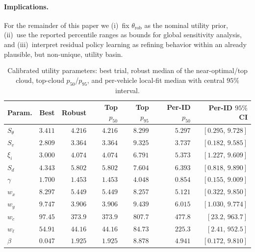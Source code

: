\paragraph{Implications.}
For the remainder of this paper we (i)~fix $\theta_{\mathrm{rob}}$ as the nominal utility prior, (ii)~use the reported percentile ranges as bounds for global sensitivity analysis, and (iii)~interpret residual policy learning as refining behavior within an already plausible, but non-unique, utility basin.

\begin{table}[t]
\centering
\caption{Calibrated utility parameters: best trial, robust median of the near-optimal/top cloud, top-cloud $p_{50}$/$p_{95}$, and per-vehicle local-fit median with central $95\%$ interval.}
\label{tab:utility_calibration_params}
\begin{tabular}{lrrrrrr}
\toprule
Param. & Best & Robust & Top $p_{50}$ & Top $p_{95}$ & Per-ID $p_{50}$ & Per-ID $95\%$ CI \\
\midrule
$S_\theta$ & $3.411$ & $4.216$ & $4.216$ & $8.299$ & $5.297$ & $[0.295,\,9.728]$ \\
$S_v$      & $2.809$ & $3.364$ & $3.364$ & $9.325$ & $3.737$ & $[0.182,\,9.585]$ \\
$\xi_i$    & $3.000$ & $4.074$ & $4.074$ & $6.791$ & $5.373$ & $[1.227,\,9.609]$ \\
$S_d$      & $4.343$ & $5.802$ & $5.802$ & $7.604$ & $6.393$ & $[0.818,\,9.890]$ \\
$\gamma$   & $1.700$ & $1.453$ & $1.453$ & $4.048$ & $0.854$ & $[0.155,\,9.009]$ \\
$w_x$      & $8.297$ & $5.449$ & $5.449$ & $8.257$ & $5.121$ & $[0.322,\,9.850]$ \\
$w_y$      & $9.747$ & $3.906$ & $3.906$ & $9.439$ & $6.015$ & $[1.030,\,9.774]$ \\
$w_c$      & $97.45$ & $373.9$ & $373.9$ & $807.7$ & $477.8$ & $[23.2,\,963.7]$ \\
$w_\ell$   & $54.91$ & $44.16$ & $44.16$ & $84.73$ & $225.3$ & $[2.41,\,952.5]$ \\
$\beta$   & $0.047$ & $1.925$ & $1.925$ & $8.878$ & $4.941$ & $[0.172,\,9.810]$ \\
\bottomrule
\end{tabular}
\end{table}

